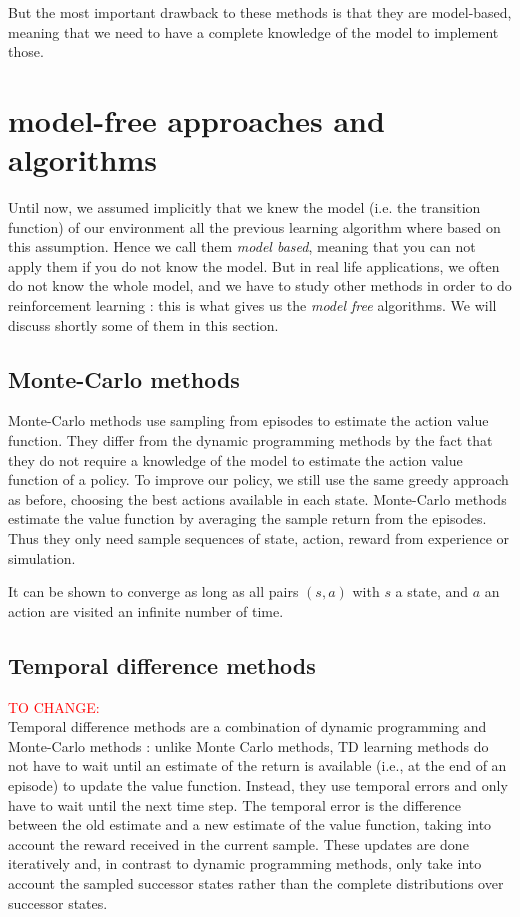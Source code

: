 \documentclass[14pt,a4paper]{article}
\theoremstyle{definition}
\begin{document}
But the most important drawback to these methods is that they are model-based, meaning that we need to have a complete knowledge of the model to implement those.

\section{model-free approaches and algorithms}

Until now, we assumed implicitly that we knew the model (i.e. the transition function) of our environment all the previous learning algorithm where based on this assumption. Hence we call them \emph{model based}, meaning that you can not apply them if you do not know the model. But in real life applications, we often do not know the whole model, and we have to study other methods in order to do reinforcement learning : this is what gives us the \emph{model free} algorithms. We will discuss shortly some of them in this section.

\subsection{Monte-Carlo methods}
Monte-Carlo methods use sampling from episodes to estimate the action value function.
They differ from the dynamic programming methods by the fact that they do not require a knowledge of the model to estimate the action value function of a policy. To improve our policy, we still use the same greedy approach as before, choosing the best actions available in each state.
Monte-Carlo methods estimate the value function by averaging the sample return from the episodes. Thus they only need sample sequences of state, action, reward from experience or simulation. 


 It can be shown to converge as long as all pairs $(s,a)$ with $s$ a state, and $a$ an action are visited an infinite number of time.
\subsection{Temporal difference methods}
\textcolor{red}{TO CHANGE:}\\
Temporal difference methods are a combination of dynamic programming and Monte-Carlo methods : unlike Monte Carlo methods, TD learning methods do not have to wait until an estimate of the return is available (i.e., at the end of an episode) to update the value function. Instead, they use temporal errors and only have to wait until the next time step. The temporal error is the difference between the old estimate and a new estimate of
the value function, taking into account the reward received in the current sample.
These updates are done iteratively and, in contrast to dynamic programming
methods, only take into account the sampled successor states rather than the
complete distributions over successor states. \citep{Xia2015}
\end{document}
